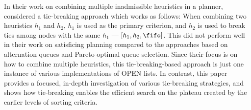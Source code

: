 In their work on combining multiple inadmissible heuristics in a planner,
\citeauthor{RogerH10} \citeyear{RogerH10} considered a tie-breaking approach which works as follows:
When combining two heuristics $h_1$ and $h_2$, $h_1$ is used as the primary criterion,
and $h_2$ is used to break ties among nodes with the same $h_1$ --- $[h_1,h_2,\fifo]$.
This did not perform well in their work on satisficing planning compared to the approaches based on alternation queues and Pareto-optimal queue selection.
% 
Since their focus is on how to combine multiple heuristics,
this tie-breaking-based approach is just one instance of various implementations of OPEN lists.
In contrast, this paper provides a focused, in-depth investigation of various tie-breaking strategies,
and shows 
how tie-breaking enables the efficient search on the plateau created by the earlier levels of sorting criteria.



